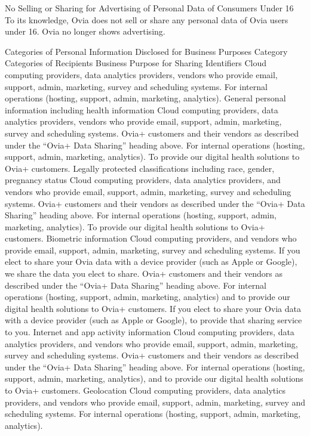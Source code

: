 No Selling or Sharing for Advertising of Personal Data of Consumers Under 16
To its knowledge, Ovia does not sell or share any personal data of Ovia users under 16. Ovia no longer shows advertising.

Categories of Personal Information Disclosed for Business Purposes
Category	Categories of Recipients	Business Purpose for Sharing
Identifiers	Cloud computing providers, data analytics providers, vendors who provide email, support, admin, marketing, survey and scheduling systems.	For internal operations (hosting, support, admin, marketing, analytics).
General personal information including health information	Cloud computing providers, data analytics providers, vendors who provide email, support, admin, marketing, survey and scheduling systems.
Ovia+ customers and their vendors as described under the “Ovia+ Data Sharing” heading above.	For internal operations (hosting, support, admin, marketing, analytics).
To provide our digital health solutions to Ovia+ customers.
Legally protected classifications including race, gender, pregnancy status	Cloud computing providers, data analytics providers, and vendors who provide email, support, admin, marketing, survey and scheduling systems.
Ovia+ customers and their vendors as described under the “Ovia+ Data Sharing” heading above.	For internal operations (hosting, support, admin, marketing, analytics).
To provide our digital health solutions to Ovia+ customers.
Biometric information	Cloud computing providers, and vendors who provide email, support, admin, marketing, survey and scheduling systems.
If you elect to share your Ovia data with a device provider (such as Apple or Google), we share the data you elect to share.
Ovia+ customers and their vendors as described under the “Ovia+ Data Sharing” heading above.	For internal operations (hosting, support, admin, marketing, analytics) and to provide our digital health solutions to Ovia+ customers.
If you elect to share your Ovia data with a device provider (such as Apple or Google), to provide that sharing service to you.
Internet and app activity information	Cloud computing providers, data analytics providers, and vendors who provide email, support, admin, marketing, survey and scheduling systems.
Ovia+ customers and their vendors as described under the “Ovia+ Data Sharing” heading above.	For internal operations (hosting, support, admin, marketing, analytics), and to provide our digital health solutions to Ovia+ customers.
Geolocation	Cloud computing providers, data analytics providers, and vendors who provide email, support, admin, marketing, survey and scheduling systems.	For internal operations (hosting, support, admin, marketing, analytics).
